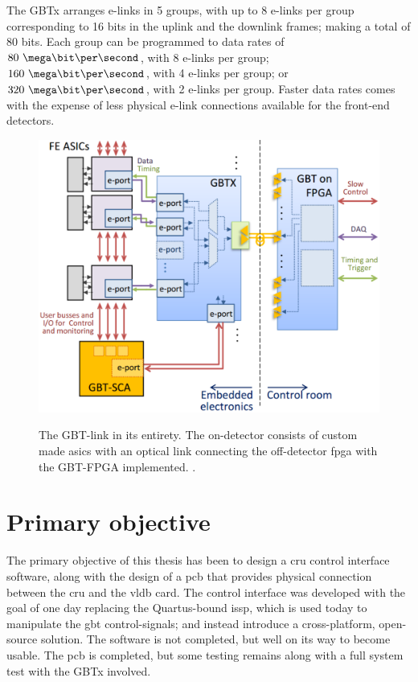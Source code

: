 \documentclass[main.tex]{subfiles}
\begin{document}
The GBTx arranges e-links in 5 groups, with up to 8 e-links per group corresponding to 16 bits in the uplink and the downlink frames; making a total of 80 bits. \cite{gbtxman11} Each group can be programmed to data rates of $80~\mega\bit\per\second$, with 8 e-links per group; $160~\mega\bit\per\second$, with 4 e-links per group; or $320~\mega\bit\per\second$, with 2 e-links per group. Faster data rates comes with the expense of less physical e-link connections available for the front-end detectors.

\begin{figure} %
\includegraphics[width=0.7\linewidth]{../img/gbtsys}  \\[0.1 cm]
\caption{The GBT-link in its entirety. The on-detector consists of custom made \glspl{asic} with an optical link connecting the off-detector \gls{fpga} with the GBT-FPGA implemented. \cite[Figure 1]{gbtscapres14}.}
\label{fig:gbtsys}
\end{figure}

\section{Primary objective}
The primary objective of this thesis has been to design a \gls{cru} control interface software, along with the design of a \gls{pcb} that provides physical connection between the \gls{cru} and the \gls{vldb} card. The control interface was developed with the goal of one day replacing the Quartus-bound \gls{issp}, which is used today to manipulate the \gls{gbt} control-signals; and instead introduce a cross-platform, open-source solution. The software is not completed, but well on its way to become usable. The \gls{pcb} is completed, but some testing remains along with a full system test with the GBTx involved.
\end{document}
